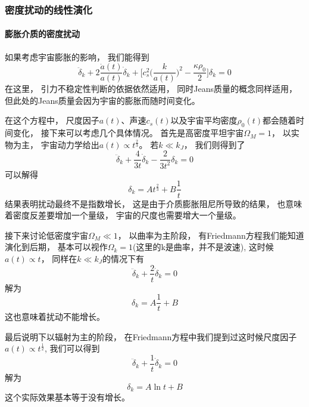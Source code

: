 \documentclass[8pt]{beamer}
\begin{document}
        \begin{frame}[fragile]
            \frametitle{密度扰动的线性演化}
            \framesubtitle{膨胀介质的密度扰动}
            \begin{multicols}{2} 
                \qquad
                如果考虑宇宙膨胀的影响，
                我们能得到
                $$\ddot{\delta}_k+2\frac{\dot{a}(t)}{a(t)}\dot{\delta}_k+\biggl[c_s^2\biggl(\frac{k}{a(t)}\biggr)^2-\frac{\kappa\rho_0}{2}\biggr]\delta_k=0$$
                在这里，
                引力不稳定性判断的依据依然适用，
                同时Jeans质量的概念同样适用，
                但此处的Jeans质量会因为宇宙的膨胀而随时间变化。

                \qquad
                在这个方程中，
                尺度因子$a(t)$、声速$c_s(t)$以及宇宙平均密度$\rho_0(t)$都会随着时间变化，
                接下来可以考虑几个具体情况。
                首先是高密度平坦宇宙$\Omega_M=1$，
                以实物为主，
                宇宙动力学给出$a(t)\varpropto t^{\frac{2}{3}}$。
                若$k\ll k_J$，
                我们则得到了
                $$\ddot{\delta}_k+\frac{4}{3t}\dot{\delta}_k-\frac{2}{3t^2}\delta_k=0$$
                可以解得
                $$\delta_k=At^{\frac{2}{3}}+B\frac{1}{t}$$
                结果表明扰动最终不是指数增长，
                这是由于介质膨胀阻尼所导致的结果，
                也意味着密度反差要增加一个量级，
                宇宙的尺度也需要增大一个量级。

                \qquad
                接下来讨论低密度宇宙$\Omega_M\ll1$，
                以曲率为主阶段，
                有Friedmann方程我们能知道演化到后期，
                基本可以视作$\Omega_{k}=1$(这里的k是曲率，并不是波速),
                这时候$a(t)\varpropto t$，
                同样在$k\ll k_J$的情况下有
                $$\ddot{\delta}_k+\frac{2}{t}\dot{\delta}_k=0$$
                解为$$\delta_k=A\frac{1}{t}+B$$
                这也意味着扰动不能增长。

                \qquad
                最后说明下以辐射为主的阶段，
                在Friedmann方程中我们提到过这时候尺度因子$a(t)\varpropto t^{\frac{1}{2}}$,
                我们可以得到
                $$\ddot{\delta}_k+\frac{1}{t}\dot{\delta}_k=0$$
                解为
                $$\delta_k=A\ln t+B$$
                这个实际效果基本等于没有增长。

            \end{multicols}
        \end{frame}
\end{document}
